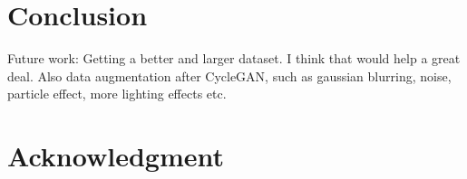 \documentclass[conference,reqno]{IEEEtran}
\begin{document}
\section{Conclusion}

Future work: Getting a better and larger dataset. I think that would help a great deal. Also data augmentation
after CycleGAN, such as gaussian blurring, noise, particle effect, more lighting effects etc.

\section*{Acknowledgment}



\end{document}
